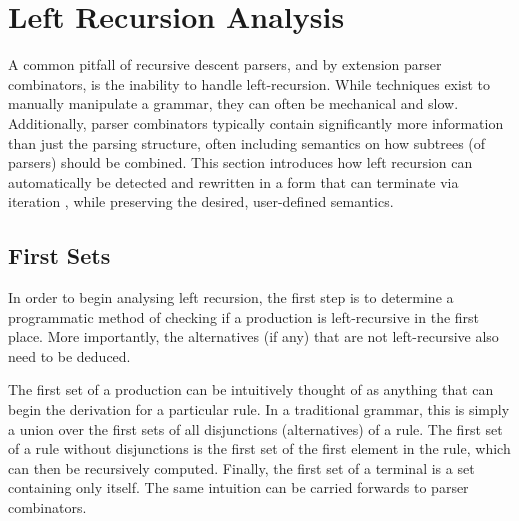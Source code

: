 \section{Left Recursion Analysis}
\label{sec:lrec_analysis}

A common pitfall of recursive descent parsers, and by extension parser combinators, is the inability to handle left-recursion.
While techniques exist to manually manipulate a grammar, they can often be mechanical and slow.
Additionally, parser combinators typically contain significantly more information than just the parsing structure, often including semantics on how subtrees (of parsers) should be combined.
This section introduces how left recursion can automatically be detected and rewritten in a form that can terminate via iteration \cite{willis21}, while preserving the desired, user-defined semantics.

\subsection{First Sets}
\label{ssec:first_sets}

In order to begin analysing left recursion, the first step is to determine a programmatic method of checking if a production is left-recursive in the first place.
More importantly, the alternatives (if any) that are not left-recursive also need to be deduced.

The first set of a production can be intuitively thought of as anything that can begin the derivation for a particular rule.
In a traditional grammar, this is simply a union over the first sets of all disjunctions (alternatives) of a rule.
The first set of a rule without disjunctions is the first set of the first element in the rule, which can then be recursively computed.
Finally, the first set of a terminal is a set containing only itself.
The same intuition can be carried forwards to parser combinators.

